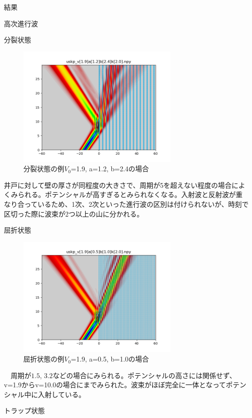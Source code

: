 \documentclass[a4paper, lualatex]{bxjsarticle}
\begin{document}
\begin{section}{結果}
\begin{subsection}{高次進行波}
    \end{subsection}
    \begin{subsection}{分裂状態}
        \begin{figure}[h]
            \centering
            \includegraphics[width=8cm]{bunretsu.png}
            \caption{分裂状態の例$V_0$=1.9, a=1.2, b=2.4の場合}
        \end{figure}
    \par 井戸に対して壁の厚さが同程度の大きさで、周期が5を超えない程度の場合によくみられる。ポテンシャルが高すぎるとみられなくなる。入射波と反射波が重なり合っているため、1次、2次といった進行波の区別は付けられないが、時刻で区切った際に波束が2つ以上の山に分かれる。
    \end{subsection}
    \begin{subsection}{屈折状態}
       \begin{figure}[h]
           \centering
           \includegraphics[width=8cm]{kussetsu.png}
           \caption{屈折状態の例$V_0$=1.9, a=0.5, b=1.0の場合}
       \end{figure}
   \par　周期が$1.5$, $3.2$などの場合にみられる。ポテンシャルの高さには関係せず、v=1.9からv=10.0の場合にまでみられた。波束がほぼ完全に一体となってポテンシャル中に入射している。
    \end{subsection}
    \begin{subsection}{トラップ状態}

\end{subsection}
\end{section}
\end{document}
